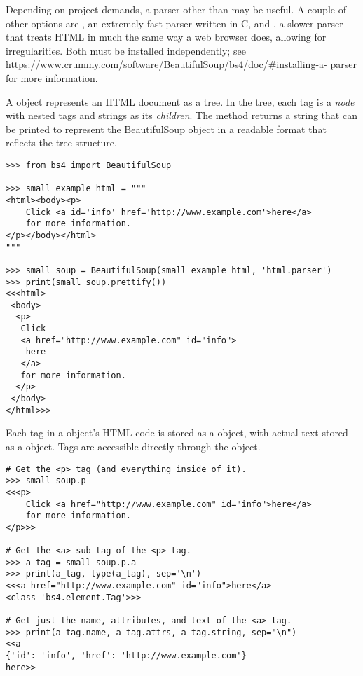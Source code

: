 \begin{info}
Depending on project demands, a parser other than  may be useful.
A couple of other options are , an extremely fast parser written in C, and , a slower parser that treats HTML in much the same way a web browser does, allowing for irregularities.
Both must be installed independently; see \url{https://www.crummy.com/software/BeautifulSoup/bs4/doc/\#installing-a-	parser} for more information.
\end{info}

A  object represents an HTML document as a tree.
In the tree, each tag is a \emph{node} with nested tags and strings as its \emph{children}.
The  method returns a string that can be printed to represent the BeautifulSoup object in a readable format that reflects the tree structure.

\begin{lstlisting}
>>> from bs4 import BeautifulSoup

>>> small_example_html = """
<html><body><p>
    Click <a id='info' href='http://www.example.com'>here</a>
    for more information.
</p></body></html>
"""

>>> small_soup = BeautifulSoup(small_example_html, 'html.parser')
>>> print(small_soup.prettify())
<<<html>
 <body>
  <p>
   Click
   <a href="http://www.example.com" id="info">
    here
   </a>
   for more information.
  </p>
 </body>
</html>>>
\end{lstlisting}

Each tag in a  object's HTML code is stored as a  object, with actual text stored as a  object.
Tags are accessible directly through the  object.

\begin{lstlisting}
# Get the <p> tag (and everything inside of it).
>>> small_soup.p
<<<p>
    Click <a href="http://www.example.com" id="info">here</a>
    for more information.
</p>>>

# Get the <a> sub-tag of the <p> tag.
>>> a_tag = small_soup.p.a
>>> print(a_tag, type(a_tag), sep='\n')
<<<a href="http://www.example.com" id="info">here</a>
<class 'bs4.element.Tag'>>>

# Get just the name, attributes, and text of the <a> tag.
>>> print(a_tag.name, a_tag.attrs, a_tag.string, sep="\n")
<<a
{'id': 'info', 'href': 'http://www.example.com'}
here>>
\end{lstlisting}

